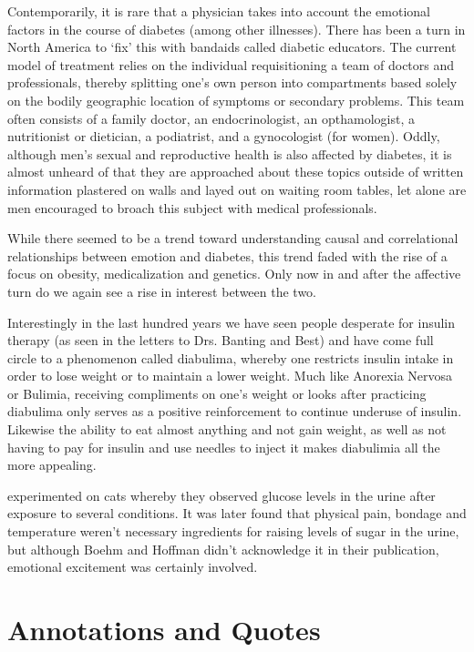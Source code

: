 \documentclass[12pt]{article}
\begin{document}
Contemporarily, it is rare that a physician takes into account the emotional factors in the course of diabetes (among other illnesses). There has been a turn in North America to `fix' this with bandaids called diabetic educators. The current model of treatment relies on the individual requisitioning a team of doctors and professionals, thereby splitting one's own person into compartments based solely on the bodily geographic location of symptoms or secondary problems. This team often consists of a family doctor, an endocrinologist, an opthamologist, a nutritionist or dietician, a podiatrist, and a gynocologist (for women). Oddly, although men's sexual and reproductive health is also affected by diabetes, it is almost unheard of that they are approached about these topics outside of written information plastered on walls and layed out on waiting room tables, let alone are men encouraged to broach this subject with medical professionals. 

While there seemed to be a trend toward understanding causal and correlational relationships between emotion and diabetes, this trend faded with the rise of a focus on obesity, medicalization and genetics. Only now in and after the affective turn do we again see a rise in interest between the two. 

Interestingly in the last hundred years we have seen people desperate for insulin therapy (as seen in the letters to Drs. Banting and Best) and have come full circle to a phenomenon called diabulima, whereby one restricts insulin intake in order to lose weight or to maintain a lower weight. Much like Anorexia Nervosa or Bulimia, receiving compliments on one's weight or looks after practicing diabulima only serves as a positive reinforcement to continue underuse of insulin. Likewise the ability to eat almost anything and not gain weight, as well as not having to pay for insulin and use needles to inject it makes diabulimia all the more appealing. 


\citet{boehm_1878_beitrage} experimented on cats whereby they observed glucose levels in the urine after exposure to several conditions. It was later found that physical pain, bondage and temperature weren't necessary ingredients for raising levels of sugar in the urine, but although Boehm and Hoffman didn't acknowledge it in their publication, emotional excitement was certainly involved.  

\section{Annotations and Quotes}
\end{document}
